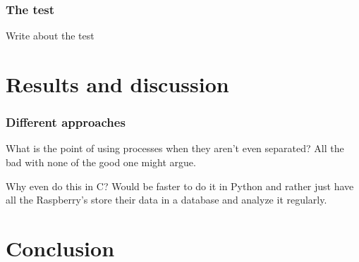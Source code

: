 \documentclass[12pt,english,a4paper]{report}
\begin{document}
\subsection{The test}
Write about the test

\chapter{Results and discussion}\label{discussion}

\subsection{Different approaches}
What is the point of using processes when they aren't even separated? All the bad with none of the good one might argue. 

Why even do this in C? Would be faster to do it in Python and rather just have all the Raspberry's store their data in a database and analyze it regularly. 

\chapter{Conclusion}




\newpage
\printbibliography[title={Complete Bibliography},heading=bibintoc]
\end{document}

